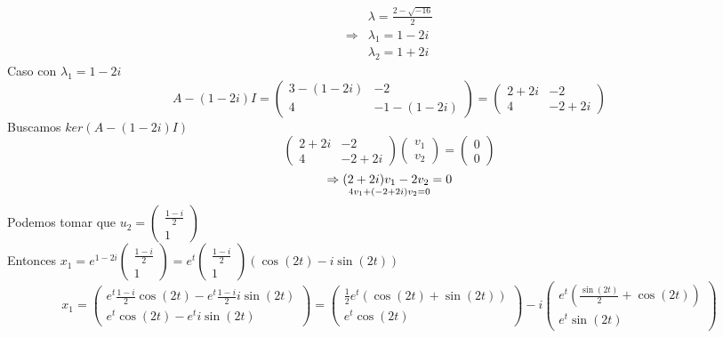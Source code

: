 \begin{equation*}
\begin{split}
    &\lambda= \frac{2-\sqrt{-16}}{2} \\ \Rightarrow &\lambda_{1}= 1-2i \\
    &\lambda_{2}=1+2i
\end{split}
\end{equation*}
Caso con $\lambda_{1}=1-2i$ 
\begin{equation*}
    A - (1-2i) I = 
\begin{pmatrix}
3 - (1-2i) & -2 \\
4 & -1 - (1-2i)
\end{pmatrix}
=
\begin{pmatrix}
2+2i& -2\\
4 & -2 +2i
\end{pmatrix}
\end{equation*}
Buscamos $ker(A - (1-2i) I)$
\begin{equation*}
\begin{pmatrix}
2+2i & -2\\
4 & -2 +2i
\end{pmatrix}
\begin{pmatrix}
v_{1}   \\
v_{2}  
\end{pmatrix} =
\begin{pmatrix}
0   \\
0  
\end{pmatrix}
\end{equation*}
\begin{equation*}
    \Rightarrow (2+2i)v_{1} -2 v_{2}=0 \atop
   4 v_{1}+ (-2 +2i) v_{2} =0
\end{equation*}
Podemos tomar que $u_{2}=\begin{pmatrix}
\frac{1-i}{2} \\
1
\end{pmatrix}$ \\
Entonces $x_{1}=e^{1-2i}\begin{pmatrix}
\frac{1-i}{2} \\
1
\end{pmatrix}
=
e^{t}
\begin{pmatrix}
\frac{1-i}{2} \\
1
\end{pmatrix}
(\cos{(2t)}-i\sin{(2t)})
$ 
\begin{equation*}
    x_{1}= 
\begin{pmatrix}
e^{t}\frac{1-i}{2}\cos{(2t)}- e^{t}\frac{1-i}{2}i\sin{(2t)}\\
e^{t}\cos{(2t)}-e^{t}i\sin{(2t)}
\end{pmatrix}
=
\begin{pmatrix}
\frac{1}{2}e^{t}(\cos{(2t)}+ \sin{(2t)}) \\
e^{t}\cos{(2t)}
\end{pmatrix}
-i
\begin{pmatrix}
e^{t}(\frac{\sin{(2t)}}{2} + \cos{(2t)}) \\
e^{t}\sin{(2t)}
\end{pmatrix}
\end{equation*}
